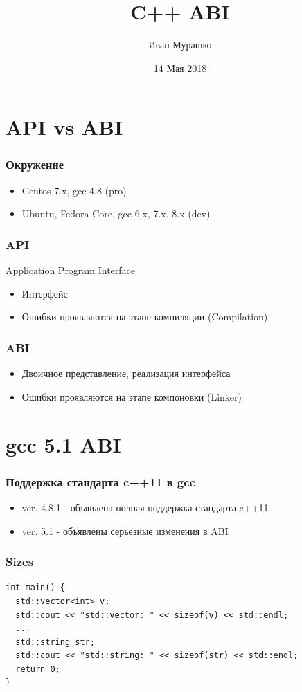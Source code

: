 \documentclass{beamer}
\title[C++ ABI]
    {C++ ABI}
\author{Иван Мурашко}
\date{14 Мая 2018}
\begin{document}
\maketitle

\section{API vs ABI}

\begin{frame}[fragile]
\frametitle{Окружение}
\begin{itemize}
\item Centos 7.x, gcc 4.8 (pro)
\item Ubuntu, Fedora Core, gcc 6.x, 7.x, 8.x (dev)
\end{itemize}
\end{frame}

\begin{frame}[fragile]
\frametitle{API}
Application Program Interface
\begin{itemize}
\item Интерфейс
\item Ошибки проявляются на этапе компиляции (Compilation)
\end{itemize}
\end{frame}

\begin{frame}[fragile]
\frametitle{ABI}
\begin{itemize}
\item Двоичное представление, реализация интерфейса
\item Ошибки проявляются на этапе компоновки (Linker)
\end{itemize}
\end{frame}

\section{gcc 5.1 ABI}

\begin{frame}[fragile]
\frametitle{Поддержка стандарта c++11 в gcc}
\begin{itemize}
\item ver. 4.8.1 - объявлена полная поддержка стандарта c++11
\item ver. 5.1 - объявлены серьезные изменения в ABI
\end{itemize}
\end{frame}

\begin{frame}[fragile]
\frametitle{Sizes}
\begin{verbatim}
int main() {
  std::vector<int> v;
  std::cout << "std::vector: " << sizeof(v) << std::endl;  
  ...
  std::string str;
  std::cout << "std::string: " << sizeof(str) << std::endl;  
  return 0;
}
\end{verbatim}
\end{frame}
\end{document}
